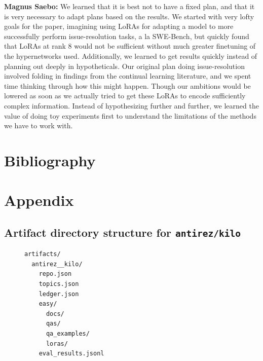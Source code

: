 \documentclass[conference,10.5pt]{IEEEtran}
\begin{document}
\textbf{Magnus Saebo:} We learned that it is best not to have a fixed plan, and that it is very necessary to adapt plans based on the results. We started with very lofty goals for the paper, imagining using LoRAs for adapting a model to more successfully perform issue-resolution tasks, a la SWE-Bench, but quickly found that LoRAs at rank 8 would not be sufficient without much greater finetuning of the hypernetworks used. Additionally, we learned to get results quickly instead of planning out deeply in hypotheticals. Our original plan doing issue-resolution involved folding in findings from the continual learning literature, and we spent time thinking through how this might happen. Though our ambitions would be lowered as soon as we actually tried to get these LoRAs to encode sufficiently complex information. Instead of hypothesizing further and further, we learned the value of doing toy experiments first to understand the limitations of the methods we have to work with.




\section{Bibliography}

\printbibliography

\section{Appendix}

\subsection{Artifact directory structure for \texttt{antirez/kilo}}

\begin{figure}[H]
\centering
\begin{minipage}{0.8\linewidth}
\begin{verbatim}
artifacts/
  antirez__kilo/
    repo.json
    topics.json
    ledger.json
    easy/
      docs/
      qas/
      qa_examples/
      loras/
    eval_results.jsonl
\end{verbatim}
\end{minipage}
\label{fig:artifact-structure}
\end{figure}

\end{document}
